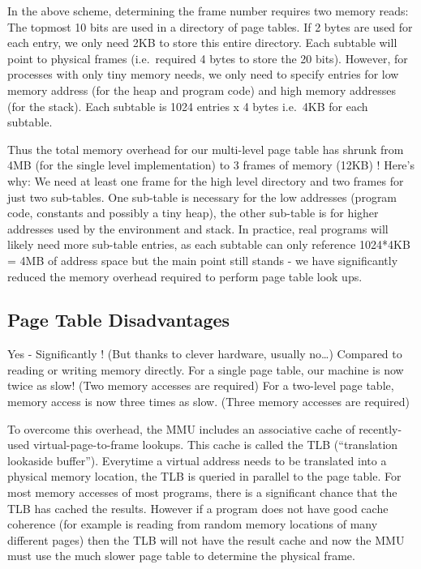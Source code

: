 \begin{enumerate}
 In the above scheme, determining the frame number requires two memory reads: The topmost 10 bits are used in a directory of page tables. If 2 bytes are used for each entry, we only need 2KB to store this entire directory. Each subtable will point to physical frames (i.e.~required 4 bytes to store the 20 bits). However, for processes with only tiny memory needs, we only need to specify entries for low memory address (for the heap and program code) and high memory addresses (for the stack). Each subtable is 1024 entries x 4 bytes i.e.~4KB for each subtable.

 Thus the total memory overhead for our multi-level page table has shrunk from 4MB (for the single level implementation) to 3 frames of memory (12KB) ! Here's why: We need at least one frame for the high level directory and two frames for just two sub-tables. One sub-table is necessary for the low addresses (program code, constants and possibly a tiny heap), the other sub-table is for higher addresses used by the environment and stack. In practice, real programs will likely need more sub-table entries, as each subtable can only reference 1024*4KB = 4MB of address space but the main point still stands - we have significantly reduced the memory overhead required to perform page table look ups.

\subsection{Page Table Disadvantages}
 Yes - Significantly ! (But thanks to clever hardware, usually no\ldots{}) Compared to reading or writing memory directly. For a single page table, our machine is now twice as slow! (Two memory accesses are required) For a two-level page table, memory access is now three times as slow. (Three memory accesses are required)

 To overcome this overhead, the MMU includes an associative cache of recently-used virtual-page-to-frame lookups. This cache is called the TLB (``translation lookaside buffer''). Everytime a virtual address needs to be translated into a physical memory location, the TLB is queried in parallel to the page table. For most memory accesses of most programs, there is a significant chance that the TLB has cached the results. However if a program does not have good cache coherence (for example is reading from random memory locations of many different pages) then the TLB will not have the result cache and now the MMU must use the much slower page table to determine the physical frame.


\end{enumerate}
